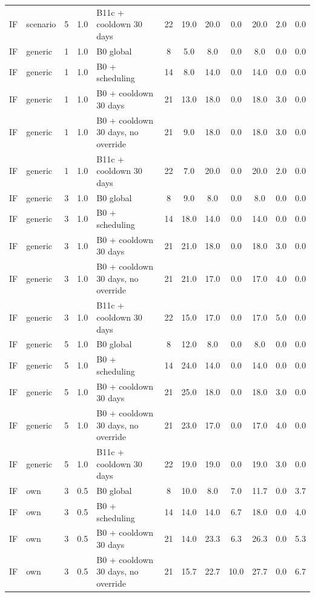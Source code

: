 \documentclass[10pt,onecolumn,letterpaper]{article}
\begin{document}
\begin{longtable}{lllllccccccc}
IF & scenario & 5 & 1.0 & B11c + cooldown 30 days & 22 & 19.0 & 20.0 & 0.0 & 20.0 & 2.0 & 0.0 \\
IF & generic & 1 & 1.0 & B0 global & 8 & 5.0 & 8.0 & 0.0 & 8.0 & 0.0 & 0.0 \\
IF & generic & 1 & 1.0 & B0 + scheduling & 14 & 8.0 & 14.0 & 0.0 & 14.0 & 0.0 & 0.0 \\
IF & generic & 1 & 1.0 & B0 + cooldown 30 days & 21 & 13.0 & 18.0 & 0.0 & 18.0 & 3.0 & 0.0 \\
IF & generic & 1 & 1.0 & B0 + cooldown 30 days, no override & 21 & 9.0 & 18.0 & 0.0 & 18.0 & 3.0 & 0.0 \\
IF & generic & 1 & 1.0 & B11c + cooldown 30 days & 22 & 7.0 & 20.0 & 0.0 & 20.0 & 2.0 & 0.0 \\
IF & generic & 3 & 1.0 & B0 global & 8 & 9.0 & 8.0 & 0.0 & 8.0 & 0.0 & 0.0 \\
IF & generic & 3 & 1.0 & B0 + scheduling & 14 & 18.0 & 14.0 & 0.0 & 14.0 & 0.0 & 0.0 \\
IF & generic & 3 & 1.0 & B0 + cooldown 30 days & 21 & 21.0 & 18.0 & 0.0 & 18.0 & 3.0 & 0.0 \\
IF & generic & 3 & 1.0 & B0 + cooldown 30 days, no override & 21 & 21.0 & 17.0 & 0.0 & 17.0 & 4.0 & 0.0 \\
IF & generic & 3 & 1.0 & B11c + cooldown 30 days & 22 & 15.0 & 17.0 & 0.0 & 17.0 & 5.0 & 0.0 \\
IF & generic & 5 & 1.0 & B0 global & 8 & 12.0 & 8.0 & 0.0 & 8.0 & 0.0 & 0.0 \\
IF & generic & 5 & 1.0 & B0 + scheduling & 14 & 24.0 & 14.0 & 0.0 & 14.0 & 0.0 & 0.0 \\
IF & generic & 5 & 1.0 & B0 + cooldown 30 days & 21 & 25.0 & 18.0 & 0.0 & 18.0 & 3.0 & 0.0 \\
IF & generic & 5 & 1.0 & B0 + cooldown 30 days, no override & 21 & 23.0 & 17.0 & 0.0 & 17.0 & 4.0 & 0.0 \\
IF & generic & 5 & 1.0 & B11c + cooldown 30 days & 22 & 19.0 & 19.0 & 0.0 & 19.0 & 3.0 & 0.0 \\
IF & own & 3 & 0.5 & B0 global & 8 & 10.0 & 8.0 & 7.0 & 11.7 & 0.0 & 3.7 \\
IF & own & 3 & 0.5 & B0 + scheduling & 14 & 14.0 & 14.0 & 6.7 & 18.0 & 0.0 & 4.0 \\
IF & own & 3 & 0.5 & B0 + cooldown 30 days & 21 & 14.0 & 23.3 & 6.3 & 26.3 & 0.0 & 5.3 \\
IF & own & 3 & 0.5 & B0 + cooldown 30 days, no override & 21 & 15.7 & 22.7 & 10.0 & 27.7 & 0.0 & 6.7 \\

\end{longtable}
\end{document}
